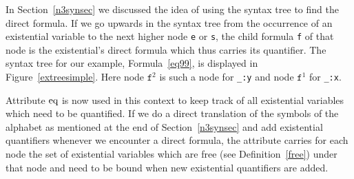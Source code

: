 In Section~\ref{n3synsec} we discussed the idea of using the syntax tree to find the direct formula. 
If we go upwards in the syntax tree from the occurrence of an existential variable to the next higher node \texttt{e} or \texttt{s}, 
the child formula \texttt{f} of that node
is the existential's direct formula which thus carries its quantifier. %
The syntax tree for our example, Formula~\ref{eq99}, is displayed in Figure~\ref{extreesimple}. 
Here node $\texttt{f}^2$ is such a node
for \texttt{\_:y}  and node $\texttt{f}^1$ for \texttt{\_:x}.

Attribute $\text{eq}$ is now used in this context to keep track of all existential variables which need to be quantified.
%
If we do a direct translation
of the symbols of the alphabet as mentioned at the end of Section~\ref{n3synsec} and add existential quantifiers whenever we encounter a direct formula, 
the attribute carries for each node the set of
existential variables which are free (see Definition~\ref{free}) under that node and need to be bound when new existential quantifiers are added.

